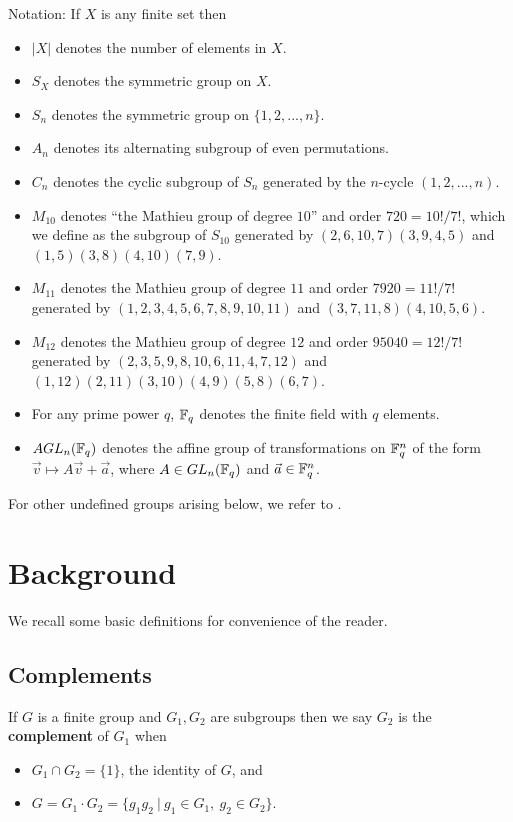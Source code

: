 Notation: If $X$ is any finite set then 
\begin{itemize}
\item
$|X|$ denotes the number of elements in $X$.
\item
$S_X$ denotes the symmetric group on $X$.
\item
$S_n$ denotes the symmetric group on $\{1,2,...,n\}$.
\item
$A_n$ denotes its alternating subgroup of even permutations.
\item
$C_n$ denotes the cyclic subgroup of $S_n$ generated by
the $n$-cycle $(1,2,...,n)$.
\item
 $M_{10}$ denotes ``the Mathieu
group of degree $10$'' and order $720=10!/7!$, which we define
as the subgroup of $S_{10}$ generated by 
$(2,6,10,7)(3,9,4,5)$ and $(1,5)(3,8)(4,10)(7,9)$. 
\item
$M_{11}$ denotes the Mathieu group of degree $11$ and order 
$7920=11!/7!$ generated by $(1,2,3,4,5,6,7,8,9,10,11)$ 
and $(3,7,11,8)(4,10,5,6)$. 
\item
$M_{12}$ denotes the Mathieu group of degree 
$12$ and order 
$95040=12!/7!$ generated by $(2,3,5,9,8,10,6,11,4,7,12)$ and 
\newline
$(1,12)(2,11)(3,10)(4,9)(5,8)(6,7)$. 
\item
For any prime power $q$, ${\Bbb F}_q$ denotes the finite field with
$q$ elements. 
\item
$AGL_n({{\Bbb F}}_q)$ denotes the affine
group of transformations on ${\Bbb F}_q^n$ of the
form $\vec{v}\longmapsto A\vec{v}+\vec{a}$,
where $A\in GL_n({{\Bbb F}}_q)$ and $\vec{a} \in {\Bbb F}_q^n$.
\end{itemize}

For other undefined groups arising below, we refer to \cite{DM}.

\section{Background}

We recall some basic definitions for convenience of the reader.

\subsection{Complements}

If $G$ is a finite group and $G_1,G_2$ are subgroups then we say 
$G_2$ is the {\bf complement} of $G_1$ when
\begin{itemize}
\item
$G_1\cap G_2=\{1\}$, the identity of $G$,
and
\item 
$G=G_1\cdot G_2=\{g_1g_2\ |\ g_1\in G_1,\ g_2\in G_2\}$.
\end{itemize}

